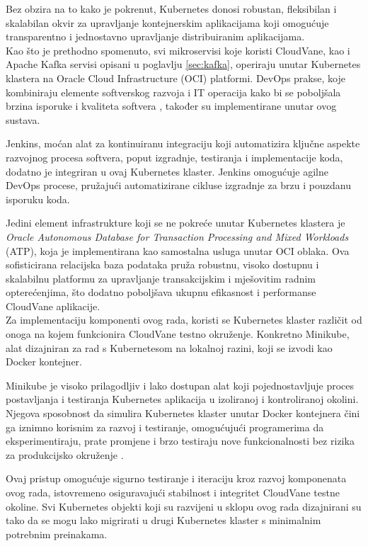 \documentclass[times, utf8, diplomski]{fer}
\begin{document}
Bez obzira na to kako je pokrenut, Kubernetes donosi robustan, fleksibilan i skalabilan okvir za upravljanje kontejnerskim aplikacijama koji omogućuje transparentno i jednostavno upravljanje distribuiranim aplikacijama. \\

Kao što je prethodno spomenuto, svi mikroservisi koje koristi CloudVane, kao i Apache Kafka servisi opisani u poglavlju \ref{sec:kafka}, operiraju unutar Kubernetes klastera na Oracle Cloud Infrastructure (OCI) platformi. DevOps prakse, koje kombiniraju elemente softverskog razvoja  i IT operacija  kako bi se poboljšala brzina isporuke i kvaliteta softvera \citep{courtemanche_what_nodate}, također su implementirane unutar ovog sustava.

Jenkins, moćan alat za kontinuiranu integraciju koji automatizira ključne aspekte razvojnog procesa softvera, poput izgradnje, testiranja i implementacije koda, dodatno je integriran u ovaj Kubernetes klaster. Jenkins omogućuje agilne DevOps procese, pružajući automatizirane cikluse izgradnje za brzu i pouzdanu isporuku koda.

Jedini element infrastrukture koji se ne pokreće unutar Kubernetes klastera je \emph{Oracle Autonomous Database for Transaction Processing and Mixed Workloads} (ATP), koja je implementirana kao samostalna usluga unutar OCI oblaka. Ova sofisticirana relacijska baza podataka pruža robustnu, visoko dostupnu i skalabilnu platformu za upravljanje transakcijskim i mješovitim radnim opterećenjima, što dodatno poboljšava ukupnu efikasnost i performanse CloudVane aplikacije.\\


Za implementaciju komponenti ovog rada, koristi se Kubernetes klaster različit od onoga na kojem funkcionira CloudVane testno okruženje. Konkretno Minikube, alat dizajniran za rad s Kubernetesom na lokalnoj razini, koji se izvodi kao Docker kontejner.

Minikube je visoko prilagodljiv i lako dostupan alat koji pojednostavljuje proces postavljanja i testiranja Kubernetes aplikacija u izoliranoj i kontroliranoj okolini. Njegova sposobnost da simulira Kubernetes klaster unutar Docker kontejnera čini ga iznimno korisnim za razvoj i testiranje, omogućujući programerima da eksperimentiraju, prate promjene i brzo testiraju nove funkcionalnosti bez rizika za produkcijsko okruženje \citep{luksa_kubernetes_2023}.

Ovaj pristup omogućuje sigurno testiranje i iteraciju kroz razvoj komponenata ovog rada, istovremeno osiguravajući stabilnost i integritet CloudVane testne okoline. Svi Kubernetes objekti koji su razvijeni u sklopu ovog rada dizajnirani su tako da se mogu lako migrirati u drugi Kubernetes klaster s minimalnim potrebnim preinakama.
\end{document}
